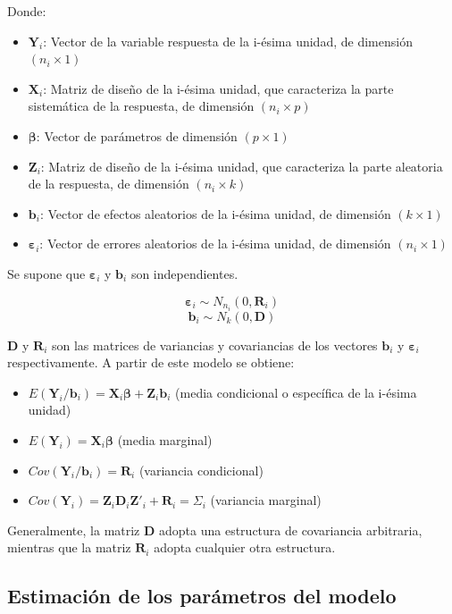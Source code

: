 \documentclass[spanish]{article}
\numberwithin{figure}{subsection}
\numberwithin{equation}{subsection}
\numberwithin{table}{subsection}
\begin{document}
Donde:

\begin{itemize}
	\item $\bm{Y}_i$: Vector de la variable respuesta de la i-ésima unidad, de
	dimensión $(n_i \times 1)$
	\item $\bm{X}_i$: Matriz de diseño de la i-ésima unidad, que caracteriza la
	parte sistemática de la respuesta, de dimensión $(n_i \times p)$
	\item $\bm{\beta}$: Vector de parámetros de dimensión $(p \times 1)$
	\item $\bm{Z}_i$: Matriz de diseño de la i-ésima unidad, que caracteriza la
	parte aleatoria de la respuesta, de dimensión $(n_i \times k)$
	\item $\bm{b}_i$: Vector de efectos aleatorios de la i-ésima unidad, de
	dimensión $(k \times 1)$
	\item $\bm{\varepsilon}_i$: Vector de errores aleatorios de la i-ésima unidad,
	de dimensión $(n_i \times 1)$
\end{itemize}

Se supone que $\bm{\varepsilon}_i$ y $\bm{b}_i$ son independientes.

\[ \bm{\varepsilon}_i \sim N_{n_i}(0, \bm{R}_i) \]
\[ \bm{b}_i \sim N_k(0, \bm{D}) \]

$\bm{D}$ y $\bm{R}_i$ son las matrices de variancias y covariancias de los
vectores $\bm{b}_i$ y $\bm{\varepsilon}_i$ respectivamente. A partir de este
modelo se obtiene:

\begin{itemize}
	\item $E(\bm{Y}_i/\bm{b}_i) = \bm{X}_i\bm{\beta} + \bm{Z}_i\bm{b}_i$ (media condicional o específica de
	la i-ésima unidad)
	\item $E(\bm{Y}_i) = \bm{X}_i\bm{\beta}$ (media marginal)
	\item $Cov(\bm{Y}_i/\bm{b}_i) = \bm{R}_i$ (variancia condicional)
	\item $Cov(\bm{Y}_i) = \bm{Z}_i \bm{D}_i \bm{Z}'_i + \bm{R}_i = \bm{\varSigma}_i$ (variancia marginal)
\end{itemize}

Generalmente, la matriz $\bm{D}$ adopta una estructura de covariancia arbitraria,
mientras que la matriz $\bm{R}_i$ adopta cualquier otra estructura.

\subsection{Estimación de los parámetros del modelo}
\end{document}
